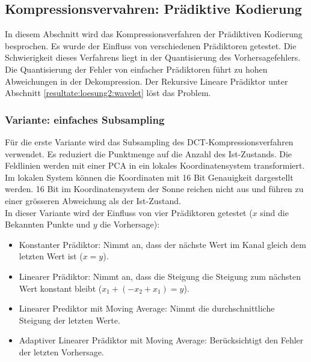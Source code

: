 \subsection{Kompressionsvervahren: Prädiktive Kodierung}  \label{resultate:loesung2}
In diesem Abschnitt wird das Kompressionsverfahren der Prädiktiven Kodierung besprochen. Es wurde der Einfluss von verschiedenen Prädiktoren getestet. Die Schwierigkeit dieses Verfahrens liegt in der Quantisierung des Vorhersagefehlers. Die Quantisierung der Fehler von einfacher Prädiktoren führt zu hohen Abweichungen in der Dekompression. Der Rekursive Lineare Prädiktor unter Abschnitt \ref{resultate:loesung2:wavelet} löst das Problem.

\subsubsection{Variante: einfaches Subsampling}
Für die erste Variante wird das Subsampling des DCT-Kompressionsverfahren verwendet. Es reduziert die Punktmenge auf die Anzahl des Ist-Zustands. Die Feldlinien werden mit einer PCA in ein lokales Koordinatensystem transformiert. Im lokalen System können die Koordinaten mit 16 Bit Genauigkeit dargestellt werden. 16 Bit im Koordinatensystem der Sonne reichen nicht aus und führen zu einer grösseren Abweichung als der Ist-Zustand.\\
In dieser Variante wird der Einfluss von vier Prädiktoren getestet ($x$ sind die Bekannten Punkte und $y$ die Vorhersage):
\begin{itemize}
\item Konstanter Prädiktor: Nimmt an, dass der nächste Wert im Kanal gleich dem  letzten Wert ist ($x = y$).
\item Linearer Prädiktor: Nimmt an, dass die Steigung die Steigung zum nächsten Wert konstant bleibt ($x_1+(-x_2+x_1) = y$).
\item Linearer Prediktor mit Moving Average: Nimmt die durchschnittliche Steigung der letzten Werte.
\item Adaptiver Linearer Prädiktor mit Moving Average: Berücksichtigt den Fehler der letzten Vorhersage.
\end{itemize}

